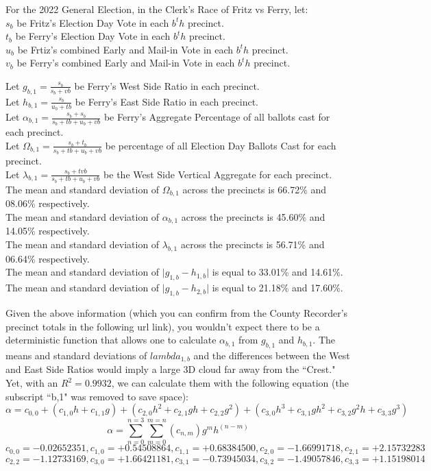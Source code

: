 \documentclass[preprint,13pt]{elsarticle}
\begin{document}
For the 2022 General Election, in the Clerk's Race of Fritz vs Ferry, let:\\
$s_{b}$ be Fritz's Election Day Vote in each $b^th$ precinct.\\
$t_{b}$ be Ferry's Election Day Vote in each $b^th$ precinct.\\
$u_{b}$ be Frtiz's combined Early and Mail-in Vote in each $b^th$ precinct.\\
$v_{b}$ be Ferry's combined Early and Mail-in Vote in each $b^th$ precinct.

Let $g_{b,1}=\frac{s_{b}}{s_{b}+v{b}}$ be Ferry's West Side Ratio in each precinct.\\
Let $h_{b,1}=\frac{s_{b}}{u_{b}+t{b}}$ be Ferry's East Side Ratio in each precinct.\\
Let $\alpha_{b,1}=\frac{s_{b}+s_{b}}{s_{b}+t{b}+u_{b}+v{b}}$ be Ferry's Aggregate Percentage of all ballots cast for each precinct.\\
Let $\Omega_{b,1}=\frac{s_{b}+t_{b}}{s_{b}+t{b}+u_{b}+v{b}}$ be percentage of all Election Day Ballots Cast for each precinct.\\
Let $\lambda_{b,1}=\frac{s_{b}+tv{b}}{s_{b}+t{b}+u_{b}+v{b}}$ be the West Side Vertical Aggregate for each precinct.\\

The mean and standard deviation of $\Omega_{b,1}$ across the precincts is 66.72\% and 08.06\% respectively.\\
The mean and standard deviation of $\alpha_{b,1}$ across the precincts is 45.60\% and 14.05\% respectively.\\
The mean and standard deviation of $\lambda_{b,1}$ across the precincts is 56.71\% and 06.64\% respectively.\\
The mean and standard deviation of $\lvert g_{1,b}-h_{1,b} \rvert$ is equal to 33.01\% and 14.61\%.\\
The mean and standard deviation of $\lvert g_{1,b}-h_{2,b} \rvert$ is equal to 21.18\% and 17.60\%.

Given the above information (which you can confirm from the County Recorder's precinct totals in the following url link), you wouldn't expect there to be a deterministic function that allows one to calculate $\alpha_{b,1}$ from $g_{b,1}$ and $h_{b,1}$. The means and standard deviations of $lambda_{1,b}$ and the differences between the West and East Side Ratios would imply a large 3D cloud far away from the ``Crest."  Yet, with an $R^2=0.9932$, we can calculate them with the following equation (the subscript ``b,1" was removed to save space):
$$\alpha=c_{0,0}+(c_{1,0}h+c_{1,1}g)+(c_{2,0}h^2+c_{2,1}gh+c_{2,2}g^2)+(c_{3,0}h^3+c_{3,1}gh^2+c_{3,2}g^2h+c_{3,3}g^3)$$
$$\alpha=\sum_{n=0}^{n=3}\sum_{m=0}^{m=n}(c_{n,m})g^mh^{(n-m)}$$
$$c_{0,0}=-0.02652351, c_{1,0}=+0.54508864, c_{1,1}=+0.68384500, c_{2,0}=-1.66991718, c_{2,1}=+2.15732283$$
$$c_{2,2}=-1.12733169, c_{3,0}=+1.66421181, c_{3,1}=-0.73945034, c_{3,2}=-1.49057846, c_{3,3}=+1.15198014$$
\end{document}
